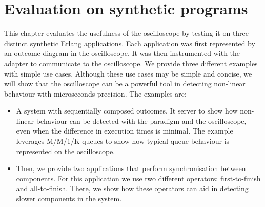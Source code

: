 \chapter{Evaluation on synthetic programs}
    This chapter evaluates the usefulness of the oscilloscope by testing it on three distinct synthetic Erlang applications. Each application was first represented by an outcome diagram in the oscilloscope. It was then instrumented with the adapter to communicate to the oscilloscope.
    We provide three different examples with simple use cases. Although these use cases may be simple and concise, we will show that the oscilloscope can be a powerful tool in detecting non-linear behaviour with microseconds precision. The examples are:
    \begin{itemize}
        \item A system with sequentially composed outcomes. It server to show how non-linear behaviour can be detected with the paradigm and the oscilloscope, even when the difference in execution times is minimal. The example leverages M/M/1/K queues to show how typical queue behaviour is represented on the oscilloscope.
        \item Then, we provide two applications that perform synchronisation between components. For this application we use two different operators: first-to-finish and all-to-finish. There, we show how these operators can aid in detecting slower components in the system.
    \end{itemize}
    
    
    
